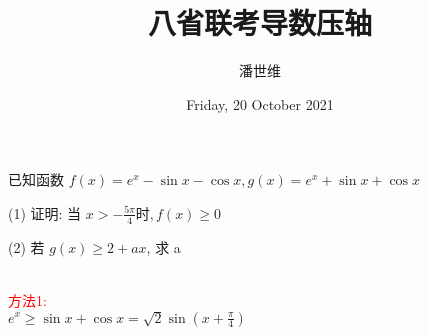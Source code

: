 \documentclass[a4paper,12pt]{article}
\begin{document}
\title {八省联考导数压轴}
\author{潘世维}
\date{Friday, 20 October 2021}
\maketitle

已知函数 $ f(x)=e^{x}-\sin x-\cos x, g(x)=e^{x}+\sin x+\cos x$


(1) 证明: 当 $ x>-\frac{5 \pi}{4}  时,  f(x) \geq 0 $



(2) 若 $ g(x) \geq 2+a x $, 求  a 
\begin{flushleft}
~\\
\textcolor{red}{方法1:}\\
$e^x \ge \sin x + \cos x = \sqrt 2 \sin \left( x + \frac{\pi }{4} \right) $


\end{flushleft}
\end{document}
